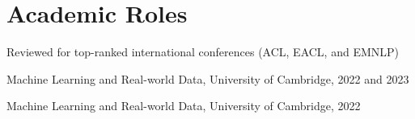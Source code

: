 \documentclass[]{cv_template}
\begin{document}
\begin{minipage}[t]{0.335\textwidth}



\section{Academic Roles}
Reviewed for top-ranked international conferences (ACL, EACL, and EMNLP)
\rightsectionsep

Machine Learning and Real-world Data, University of Cambridge, 2022 and 2023
\rightsectionsep

Machine Learning and Real-world Data, University of Cambridge, 2022
\rightsectionsep











\end{minipage}
\end{document}
